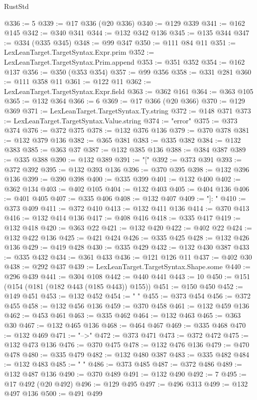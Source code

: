 \begin{lexlean}{RustStd}
\begin{coremodule}
@336 := 5
@339 := @17 @336 (@20 @336)
@340 := @129 @339
@341 := @162 @145
@342 := @340 @341
@344 := @132 @342 @136
@345 := @135 @344
@347 := @334 (@335 @345)
@348 := @99 @347
@350 := @111 @84 @11
@351 := LexLeanTarget.TargetSyntax.Expr.prim
@352 := LexLeanTarget.TargetSyntax.Prim.append
@353 := @351 @352
@354 := @162 @137
@356 := @350 (@353 @354)
@357 := @99 @356
@358 := @331 @281
@360 := @111 @358 @11
@361 := @122 @11
@362 := LexLeanTarget.TargetSyntax.Expr.field
@363 := @362 @161
@364 := @363 @105
@365 := @132 @364
@366 := 6
@369 := @17 @366 (@20 @366)
@370 := @129 @369
@371 := LexLeanTarget.TargetSyntax.Ty.string
@372 := @148 @371
@373 := LexLeanTarget.TargetSyntax.Value.string
@374 := "error"
@375 := @373 @374
@376 := @372 @375
@378 := @132 @376 @136
@379 := @370 @378
@381 := @132 @379 @136
@382 := @365 @381
@383 := @335 @382
@384 := @132 @383
@385 := @363 @37
@387 := @132 @385 @136
@388 := @384 @387
@389 := @335 @388
@390 := @132 @389
@391 := "["
@392 := @373 @391
@393 := @372 @392
@395 := @132 @393 @136
@396 := @370 @395
@398 := @132 @396 @136
@399 := @390 @398
@400 := @335 @399
@401 := @132 @400
@402 := @362 @134
@403 := @402 @105
@404 := @132 @403
@405 := @404 @136
@406 := @401 @405
@407 := @335 @406
@408 := @132 @407
@409 := "]: "
@410 := @373 @409
@411 := @372 @410
@413 := @132 @411 @136
@414 := @370 @413
@416 := @132 @414 @136
@417 := @408 @416
@418 := @335 @417
@419 := @132 @418
@420 := @363 @22
@421 := @132 @420
@422 := @402 @22
@424 := @132 @422 @136
@425 := @421 @424
@426 := @335 @425
@428 := @132 @426 @136
@429 := @419 @428
@430 := @335 @429
@432 := @132 @430 @387
@433 := @335 @432
@434 := @361 @433
@436 := @121 @126 @11
@437 := @402 @30
@438 := @292 @437
@439 := LexLeanTarget.TargetSyntax.Shape.some
@440 := @296 @439
@441 := @304 @108
@442 := @440 @441
@443 := 10
@450 := @151 (@154 (@181 (@182 @443 (@185 @443)) @155))
@451 := @150 @450
@452 := @149 @451
@453 := @132 @452
@454 := "  "
@455 := @373 @454
@456 := @372 @455
@458 := @132 @456 @136
@459 := @370 @458
@461 := @132 @459 @136
@462 := @453 @461
@463 := @335 @462
@464 := @132 @463
@465 := @363 @30
@467 := @132 @465 @136
@468 := @464 @467
@469 := @335 @468
@470 := @132 @469
@471 := "-->"
@472 := @373 @471
@473 := @372 @472
@475 := @132 @473 @136
@476 := @370 @475
@478 := @132 @476 @136
@479 := @470 @478
@480 := @335 @479
@482 := @132 @480 @387
@483 := @335 @482
@484 := @132 @483
@485 := " "
@486 := @373 @485
@487 := @372 @486
@489 := @132 @487 @136
@490 := @370 @489
@491 := @132 @490
@492 := 7
@495 := @17 @492 (@20 @492)
@496 := @129 @495
@497 := @496 @313
@499 := @132 @497 @136
@500 := @491 @499

\end{coremodule}
\end{lexlean}
